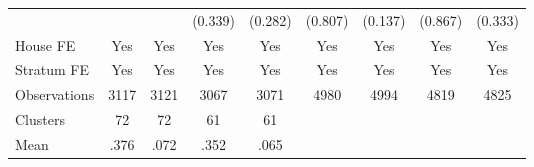 {\begin{tabular}{l*{8}{c}}
                &                  &                  &  (0.339)         &  (0.282)         &  (0.807)         &  (0.137)         &  (0.867)         &  (0.333)         \\
House FE        &      Yes         &      Yes         &      Yes         &      Yes         &      Yes         &      Yes         &      Yes         &      Yes         \\
Stratum FE      &      Yes         &      Yes         &      Yes         &      Yes         &      Yes         &      Yes         &      Yes         &      Yes         \\
\midrule
Observations    &     3117         &     3121         &     3067         &     3071         &     4980         &     4994         &     4819         &     4825         \\
Clusters        &       72         &       72         &       61         &       61         &                  &                  &                  &                  \\
Mean            &     .376         &     .072         &     .352         &     .065         &                  &                  &                  &                  \\
\bottomrule
\end{tabular}
}
